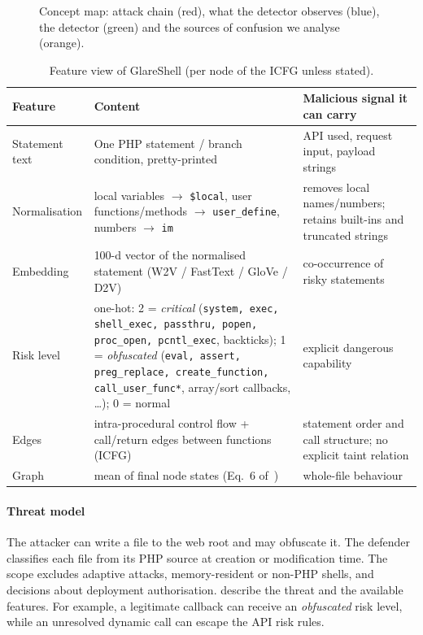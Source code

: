\begin{figure}[!t]
{}
\caption{Concept map: attack chain (red), what the detector observes (blue), the detector (green) and
the sources of confusion we analyse (orange).}
\label{fig:concept}
\end{figure}
\begin{table}[!t]
\centering\small
\caption{Feature view of GlareShell (per node of the ICFG unless stated).}
\label{tab:features}
\begin{tabularx}{\linewidth}{@{}lXl@{}}
\toprule
Feature & Content & Malicious signal it can carry \\ \midrule
Statement text & One PHP statement / branch condition, pretty-printed & API used, request input, payload strings \\
Normalisation & local variables $\to$ \texttt{\$local}, user functions/methods $\to$ \texttt{user\_define}, numbers $\to$ \texttt{im} & removes local names/numbers; retains built-ins and truncated strings \\
Embedding & 100-d vector of the normalised statement (W2V / FastText / GloVe / D2V) & co-occurrence of risky statements \\
Risk level & one-hot: 2 = \emph{critical} (\texttt{system, exec, shell\_exec, passthru, popen, proc\_open, pcntl\_exec}, backticks); 1 = \emph{obfuscated} (\texttt{eval, assert, preg\_replace, create\_function, call\_user\_func*}, array/sort callbacks, \dots); 0 = normal & explicit dangerous capability \\
Edges & intra-procedural control flow + call/return edges between functions (ICFG) & statement order and call structure; no explicit taint relation \\
Graph & mean of final node states (Eq.~6 of~\paperref{}) & whole-file behaviour \\
\bottomrule
\end{tabularx}
\end{table}

\paragraph{Threat model}
The attacker can write a file to the web root and may obfuscate it. The defender classifies each file from
its PHP source at creation or modification time. The scope excludes adaptive attacks, memory-resident or
non-PHP shells, and decisions about deployment authorisation.  describe the
threat and the available features. For example, a legitimate callback can receive an \emph{obfuscated} risk
level, while an unresolved dynamic call can escape the API risk rules.

